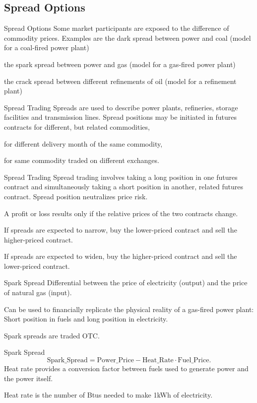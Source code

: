 \subsection{Spread Options}

Spread Options
Some market participants are exposed to the difference of
commodity prices. Examples are
	the dark spread between power and coal (model for a coal-fired power plant)
  
	the spark spread between power and gas (model for a gas-fired power plant)
  
	the crack spread between different refinements of oil (model for a refinement plant)


Spread Trading
Spreads are used to describe power plants, refineries, storage facilities and transmission lines. Spread positions may be initiated in futures contracts
	for different, but related commodities,
  
	for different delivery month of the same commodity,
  
	for same commodity traded on different exchanges.



Spread Trading
Spread trading involves taking a long position in one futures contract and simultaneously taking a short position in another, related futures contract.
	Spread position neutralizes price risk.
  
	A profit or loss results only if the relative prices of the two contracts change.
  
	If spreads are expected to narrow, buy the lower-priced contract and sell the higher-priced contract.
  
	If spreads are expected to widen, buy the higher-priced contract and sell the lower-priced contract.


Spark Spread
	Differential between the price of electricity (output) and the price of natural gas (input).
  
	Can be used to financially replicate the physical reality of a gas-fired power plant: Short position in fuels and long position in electricity.
  
	Spark spreads are traded OTC.


Spark Spread
	$$\text{Spark\_Spread}=\text{Power\_Price} - \text{Heat\_Rate}\cdot\text{Fuel\_Price}.$$
	\vspace{0.2cm}
		Heat rate provides a conversion factor between fuels used to generate power and the power itself.
		
		Heat rate is the number of Btus needed to make 1kWh of electricity.
		
